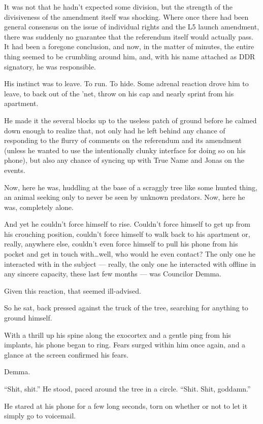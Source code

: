 It was not that he hadn't expected some division, but the strength of the divisiveness of the amendment itself was shocking. Where once there had been general consensus on the issue of individual rights and the L5 launch amendment, there was suddenly no guarantee that the referendum itself would actually pass. It had been a foregone conclusion, and now, in the matter of minutes, the entire thing seemed to be crumbling around him, and, with his name attached as DDR signatory, he was responsible.

His instinct was to leave. To run. To hide. Some adrenal reaction drove him to leave, to back out of the 'net, throw on his cap and nearly sprint from his apartment.

He made it the several blocks up to the useless patch of ground before he calmed down enough to realize that, not only had he left behind any chance of responding to the flurry of comments on the referendum and its amendment (unless he wanted to use the intentionally clunky interface for doing so on his phone), but also any chance of syncing up with True Name and Jonas on the events.

Now, here he was, huddling at the base of a scraggly tree like some hunted thing, an animal seeking only to never be seen by unknown predators. Now, here he was, completely alone.

And yet he couldn't force himself to rise. Couldn't force himself to get up from his crouching position, couldn't force himself to walk back to his apartment or, really, anywhere else, couldn't even force himself to pull his phone from his pocket and get in touch with\ldots well, who would he even contact? The only one he interacted with in the subject — really, the only one he interacted with offline in any sincere capacity, these last few months — was Councilor Demma.

Given this reaction, that seemed ill-advised.

So he sat, back pressed against the truck of the tree, searching for anything to ground himself.

With a thrill up his spine along the exocortex and a gentle ping from his implants, his phone began to ring. Fears surged within him once again, and a glance at the screen confirmed his fears.

Demma.

``Shit, shit.'' He stood, paced around the tree in a circle. ``Shit. Shit, goddamn.''

He stared at his phone for a few long seconds, torn on whether or not to let it simply go to voicemail.

